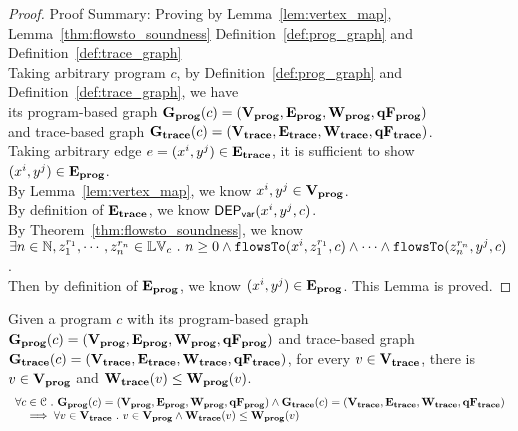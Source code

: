 \begin{proof}
Proof Summary: Proving by Lemma~\ref{lem:vertex_map}, Lemma~\ref{thm:flowsto_soundness} Definition~\ref{def:prog_graph} and Definition~\ref{def:trace_graph}
\\
Taking arbitrary program $c$,
by Definition~\ref{def:prog_graph} and Definition~\ref{def:trace_graph}, 
we have   
\\
its program-based graph $\mathtt{\bf{G_{prog}}}({c}) = (\mathtt{\bf{V_{prog}}}, \mathtt{\bf{E_{prog}}}, \mathtt{\bf{W_{prog}}}, \mathtt{\bf{qF_{prog}}})$ 
\\
and 
trace-based graph $\mathtt{\bf{G_{trace}}}({c}) = (\mathtt{\bf{V_{trace}}}, \mathtt{\bf{E_{trace}}}, \mathtt{\bf{W_{trace}}}, \mathtt{\bf{qF_{trace}}})$.
\\
Taking arbitrary edge $e = (x^i, y^j) \in \mathtt{\bf{E_{trace}}}$, it is sufficient to show $(x^i, y^j) \in \mathtt{\bf{E_{prog}}}$.
\\
By Lemma~\ref{lem:vertex_map}, we know $x^i, y^j \in \mathtt{\bf{V_{prog}}}$.
\\
By definition of $\mathtt{\bf{E_{trace}}}$, we know $\mathsf{DEP_{var}}(x^i, y^j, c)$.
\\
By Theorem~\ref{thm:flowsto_soundness}, we know $ \exists n \in \mathbb{N}, z_1^{r_1}, \cdots, z_n^{r_n} \in \mathbb{LV}_{{c}} ~.~ 
n \geq 0 \land
\mathtt{flowsTo}(x^i,  z_1^{r_1}, c) 
\land \cdots \land \mathtt{flowsTo}(z_n^{r_n}, y^j, c) $.
\\
Then by definition of $\mathtt{\bf{E_{prog}}}$, we know $(x^i, y^j) \in \mathtt{\bf{E_{prog}}}$. This Lemma is proved.
\end{proof}
%
\begin{lem}
	\label{lem:weights_map}
	Given a program $c$ with its
	program-based graph $\mathtt{\bf{G_{prog}}}({c}) = (\mathtt{\bf{V_{prog}}}, \mathtt{\bf{E_{prog}}}, \mathtt{\bf{W_{prog}}}, \mathtt{\bf{qF_{prog}}})$
	and 
	trace-based graph $\mathtt{\bf{G_{trace}}}({c}) = (\mathtt{\bf{V_{trace}}}, \mathtt{\bf{E_{trace}}}, \mathtt{\bf{W_{trace}}}, \mathtt{\bf{qF_{trace}}})$,
	for every $v \in \mathtt{\bf{V_{trace}}}$, there is $v \in \mathtt{\bf{V_{prog}}}$ and $\mathtt{\bf{W_{trace}}}(v) \leq \mathtt{\bf{W_{prog}}}(v)$.
%
%
\[
	\begin{array}{l}
	\forall c \in \mathcal{C} 
	 ~.~ 
	 \mathtt{\bf{G_{prog}}}({c}) = (\mathtt{\bf{V_{prog}}}, \mathtt{\bf{E_{prog}}}, \mathtt{\bf{W_{prog}}}, \mathtt{\bf{qF_{prog}}})
	\land 
	\mathtt{\bf{G_{trace}}}({c}) = (\mathtt{\bf{V_{trace}}}, \mathtt{\bf{E_{trace}}}, \mathtt{\bf{W_{trace}}}, \mathtt{\bf{qF_{trace}}})
	\\ \quad
	\implies
	\forall v \in \mathtt{\bf{V_{trace}}} ~.~ 
	v \in \mathtt{\bf{V_{prog}}} \land
	\mathtt{\bf{W_{trace}}}(v) \leq \mathtt{\bf{W_{prog}}}(v)
	\end{array}
	\]
	\end{lem}
